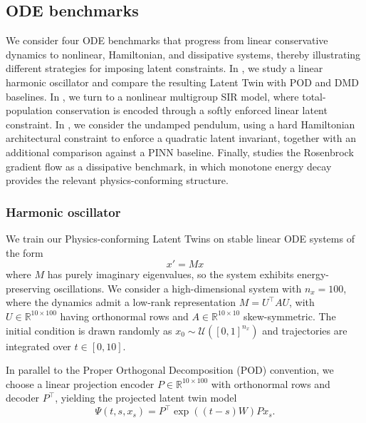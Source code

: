\documentclass[a4paper,fleqn]{cas-sc}
\theoremstyle{thmstyleone}%
\theoremstyle{thmstyletwo}%
\theoremstyle{thmstylethree}%
\begin{document}
\subsection{ODE benchmarks} \label{sec:ODEs}

We consider four ODE benchmarks that progress from linear conservative dynamics to nonlinear, Hamiltonian, and dissipative systems, thereby illustrating different strategies for imposing latent constraints. In , we study a linear harmonic oscillator and compare the resulting Latent Twin with POD and DMD baselines. In , we turn to a nonlinear multigroup SIR model, where total-population conservation is encoded through a softly enforced linear latent constraint. In , we consider the undamped pendulum, using a hard Hamiltonian architectural constraint to enforce a quadratic latent invariant, together with an additional comparison against a PINN baseline. Finally,  studies the Rosenbrock gradient flow as a dissipative benchmark, in which monotone energy decay provides the relevant physics-conforming structure.

\subsubsection{Harmonic oscillator}\label{sec:ROM}

We train our Physics-conforming Latent Twins on stable linear ODE systems of the form
\begin{equation}\label{eq:linear-ode}
    x' = Mx
\end{equation}
where $M$ has purely imaginary eigenvalues, so the system exhibits energy-preserving oscillations. We consider a high-dimensional system with $n_x=100$, where the dynamics admit a low-rank representation $M=U^\top A U$, with $U \in \mathbb{R}^{10 \times 100}$ having orthonormal rows and $A \in \mathbb{R}^{10 \times 10}$ skew-symmetric. The initial condition is drawn randomly as $x_0 \sim \mathcal{U}([0,1]^{n_x})$ and trajectories are integrated over $t \in [0, 10]$.

In parallel to the Proper Orthogonal Decomposition (POD) convention, we choose a linear projection encoder $P \in \mathbb{R}^{10 \times 100}$ with orthonormal rows and decoder $P^\top$, yielding the projected latent twin model
\begin{equation}\label{eq:projected-latent-twin}
    \Psi(t,s,x_s) = P^\top\exp((t-s)W)P x_s.
\end{equation}
\end{document}
